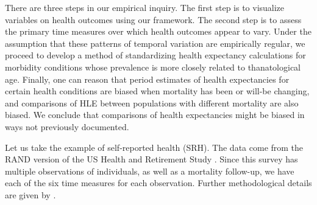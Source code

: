 \documentclass[12pt,oneside,a4paper]{article} %
\begin{document}
There are three steps in our empirical inquiry. The first step is to visualize
variables on health outcomes using our framework. The second step is to
assess the primary time measures over which health outcomes appear to vary.
Under the assumption that these patterns of temporal variation are empirically regular,
we proceed to develop a method of standardizing health expectancy calculations
for morbidity conditions whose prevalence is more closely related
to thanatological age.
Finally, one can reason that period estimates of health expectancies for certain
health conditions are biased when mortality has been or will-be changing, and
comparisons of HLE between populations with different mortality are also biased.
We conclude that comparisons of health expectancies might be biased in ways not
previously documented.

Let us take the example of self-reported health (SRH). %
 The data come from the RAND version of the US Health and Retirement Study \citep{HRS}. Since this
survey has multiple observations of individuals, as well as a mortality
follow-up, we have each of the six time measures for each observation. Further
methodological details are given by \citet{riffe2015ttd}. 
\end{document}
